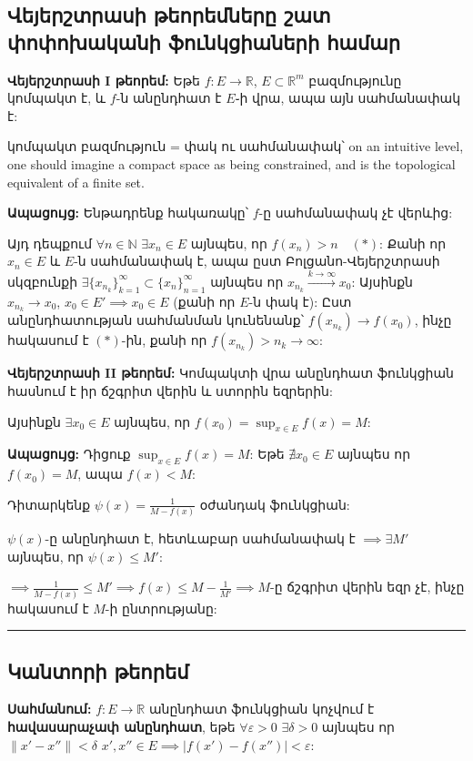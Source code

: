 \documentclass[12pt, a4paper]{article}
\begin{document}
\subsection{Վեյերշտրասի թեորեմները շատ փոփոխականի ֆունկցիաների համար}

\textbf{Վեյերշտրասի I թեորեմ:} Եթե $f: E \to \mathbb{R}$, $E \subset \mathbb{R}^m$ բազմությունը կոմպակտ է, և $f$-ն անընդհատ է $E$֊ի վրա, ապա այն սահմանափակ է:

կոմպակտ բազմություն = փակ ու սահմանափակ՝ on an intuitive level, one should imagine a compact space as being constrained, and is the topological equivalent of a finite set.

\textbf{Ապացույց:} Ենթադրենք հակառակը՝ $f$-ը սահմանափակ չէ վերևից:

Այդ դեպքում $\forall n \in \mathbb{N}$ $\exists x_n \in E$ այնպես, որ $f(x_n) > n \quad (*)$: Քանի որ $x_n \in E$ և $E$-ն սահմանափակ է, ապա ըստ Բոլցանո-Վեյերշտրասի սկզբունքի $\exists \{x_{n_k}\}_{k=1}^\infty \subset \{x_n\}_{n=1}^\infty$ այնպես որ $x_{n_k} \overset{k \to \infty}{\longrightarrow} x_0$: Այսինքն $x_{n_k} \to x_0$, $x_0 \in E' \implies x_0 \in E$ (քանի որ $E$-ն փակ է): Ըստ անընդհատության սահմանման կունենանք՝ $f(x_{n_k}) \to f(x_0)$, ինչը հակասում է $(*)$-ին, քանի որ $f(x_{n_k}) > n_k \to \infty$:

\textbf{Վեյերշտրասի II թեորեմ:} Կոմպակտի վրա անընդհատ ֆունկցիան հասնում է իր ճշգրիտ վերին և ստորին եզրերին:

Այսինքն $\exists x_0 \in E$ այնպես, որ $f(x_0) = \sup_{x \in E} f(x) = M$:

\textbf{Ապացույց:} Դիցուք $\sup_{x \in E} f(x) = M$: Եթե $\nexists x_0 \in E$ այնպես որ $f(x_0) = M$, ապա $f(x) < M$:

Դիտարկենք $\psi(x) = \frac{1}{M - f(x)}$ օժանդակ ֆունկցիան:

$\psi(x)$-ը անընդհատ է, հետևաբար սահմանափակ է $\implies \exists M'$ այնպես, որ $\psi(x) \le M'$:

$\implies \frac{1}{M - f(x)} \le M' \implies f(x) \le M - \frac{1}{M'} \implies M$-ը ճշգրիտ վերին եզր չէ, ինչը հակասում է $M$-ի ընտրությանը:

\vspace{1em}
\hrule
\vspace{1em}

\subsection{Կանտորի թեորեմ}

\textbf{Սահմանում:} $f: E \to \mathbb{R}$ անընդհատ ֆունկցիան կոչվում է \textbf{հավասարաչափ անընդհատ}, եթե $\forall \varepsilon > 0$ $\exists \delta > 0$ այնպես որ $\|x' - x''\| < \delta$ $x', x'' \in E \implies |f(x') - f(x'')| < \varepsilon$:
\end{document}
